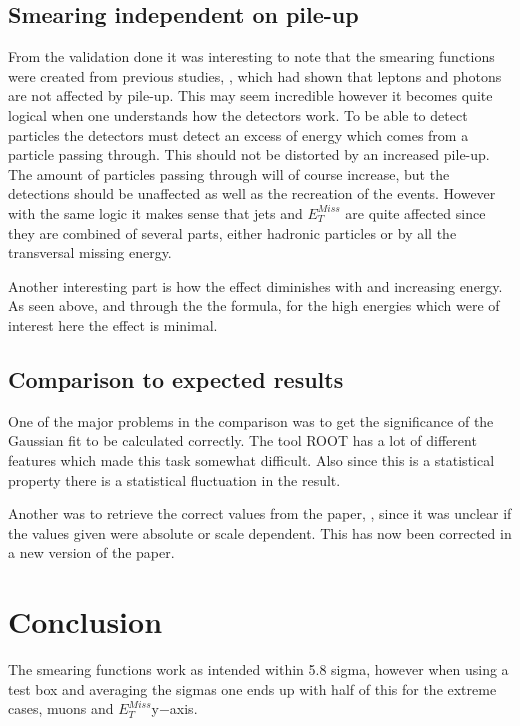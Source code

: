 \subsection{Smearing independent on pile-up}\label{chap:vali:sec:dis:subsec:smearindep}
From the validation done it was interesting to note that the smearing functions were created from previous studies, \citep{Electronperf:2011, ATLAS:LOI2}, which had shown that leptons and photons are not affected by pile-up.
This may seem incredible however it becomes quite logical when one understands how the detectors work. To be able to detect particles the detectors must detect an excess of energy which comes from a particle passing through. This should not be distorted by an increased pile-up. The amount of particles passing through will of course increase, but the detections should be unaffected as well as the recreation of the events. However with the same logic it makes sense that jets and $E_T^{Miss}$ are quite affected since they are combined of several parts, either hadronic particles or by all the transversal missing energy. 

Another interesting part is how the effect diminishes with and increasing energy. As seen above, and through the the formula, for the high energies which were of interest here the effect is minimal. 
\subsection{Comparison to expected results}
One of the major problems in the comparison was to get the significance of the Gaussian fit to be calculated correctly. The tool ROOT has a lot of different features which made this task somewhat difficult. Also since this is a statistical property there is a statistical fluctuation in the result. 

Another was to retrieve the correct values from the paper, \citep{ATL-PHYS-PUB-2013-004}, since it was unclear if the values given were absolute or scale dependent. This has now been corrected in a new version of the paper.
\newpage
\section{Conclusion}
The smearing functions work as intended within 5.8 sigma, however when using a test box and averaging the sigmas one ends up with half of this for the extreme cases, muons and $E_T^{Miss} $y$-$axis.